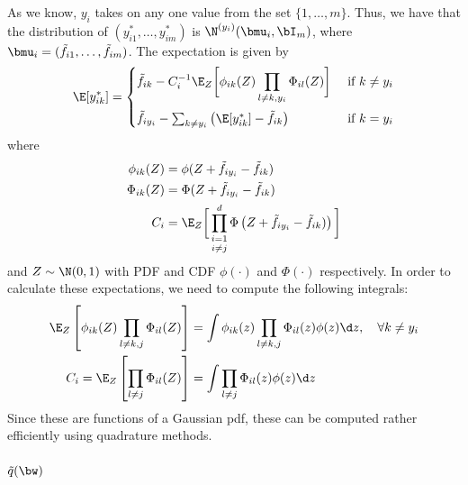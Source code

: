 \documentclass[]{article}
\begin{document}
As we know, $y_i$ takes on any one value from the set $\{1,\dots,m\}$. Thus, we have that the distribution of $(y^*_{i1}, \dots, y^*_{im})$ is $\N^{(y_i)}(\bmu_i, \bI_m)$, where $\bmu_i = (\tilde f_{i1}, \dots, \tilde f_{im})$. The expectation is given by
\[
  \E[y_{ik}^*] = 
  \begin{cases}
    \tilde f_{ik} - C_i^{-1}\displaystyle{ \E_Z\bigg[\phi_{ik}(Z) \prod_{l \neq k,y_i} \Phi_{il}(Z) \bigg] }
    &\text{ if } k \neq y_i \\[1.5em]
    \tilde f_{iy_i} - \sum_{k \neq y_i} \big(\E[y_{ik}^*] - \tilde f_{ik} \big) &\text{ if } k = y_i \\
  \end{cases}
\]
where
\begin{align*}
  \phi_{ik}(Z) &= \phi(Z + \tilde f_{iy_i} - \tilde f_{ik}) \\
  \Phi_{ik}(Z) &= \Phi(Z + \tilde f_{iy_i} - \tilde f_{ik}) \\
  C_i &= \E_Z \bigg[ \mathop{\prod_{i=1}^d}_{i \neq j} \Phi \left(Z + \tilde f_{iy_i} - \tilde f_{ik}) \right) \bigg]  
\end{align*}
and $Z \sim \N(0,1)$ with PDF and CDF $\phi(\cdot)$ and $\Phi(\cdot)$ respectively. In order to calculate these expectations, we need to compute the following integrals:
\begin{align*}
  \E_Z\left[\phi_{ik}(Z) \prod_{l \neq k,j} \Phi_{il}(Z) \right]
  &= \int \phi_{ik}(z) \prod_{l \neq k,j} \Phi_{il}(z) \phi(z) \d z, \ \ \ \forall k \neq y_i \\
  C_i = \E_Z\left[\prod_{l \neq j} \Phi_{il}(Z) \right] 
  &= \int \prod_{l \neq j} \Phi_{il}(z) \phi(z) \d z 
\end{align*}
Since these are functions of a Gaussian pdf, these can be computed rather efficiently using quadrature methods.

\subsubsection{$\tilde q(\bw)$}
\end{document}
